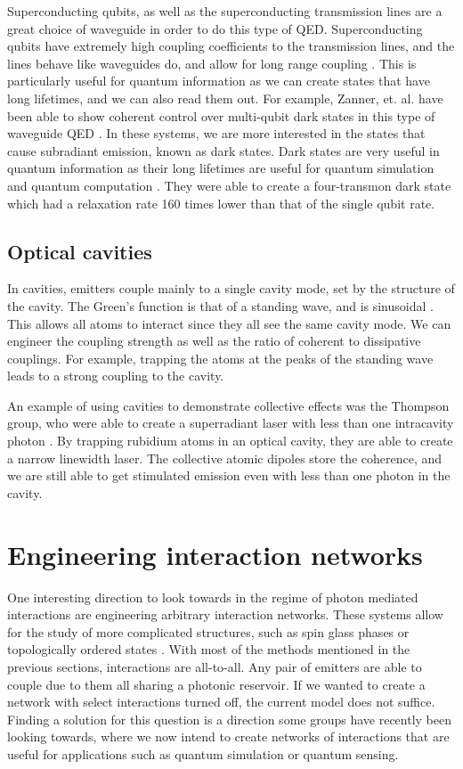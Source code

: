 \documentclass{article}
\begin{document}
Superconducting qubits, as well as the superconducting transmission lines are a great
choice of waveguide in order to do this type of QED. Superconducting qubits have
extremely high coupling coefficients to the transmission lines, and the lines behave
like waveguides do, and allow for long range coupling \cite{mirhosseini_cavity_2019,astafiev_resonance_2010}. This is particularly useful for
quantum information as we can create states that have long lifetimes, and we can also
read them out. For example, Zanner, et. al. have been able to show coherent control
over multi-qubit dark states in this type of waveguide QED \cite{zanner_coherent_2022}. In these systems, we are
more interested in the states that cause subradiant emission, known as dark states.
Dark states are very useful in quantum information as their long lifetimes are useful for
quantum simulation and quantum computation \cite{lidar_decoherence-free_1998,paulisch_universal_2016}. They were able to create a four-transmon dark state which had a relaxation
rate 160 times lower than that of the single qubit rate.
\subsection{Optical cavities}
In cavities, emitters couple mainly to a single cavity mode, set by the structure of
the cavity. The Green's function is that of a standing wave, and is
sinusoidal \cite{lodahl_interfacing_2015}. This allows all atoms to interact since they all see the same cavity mode.
We can engineer the coupling strength as well as the ratio of coherent to dissipative
couplings. For example, trapping the atoms at the peaks of the standing wave leads to
a strong coupling to the cavity.

An example of using cavities to demonstrate collective effects was the
Thompson group, who were able to create a superradiant laser with less than one intracavity
photon \cite{bohnet_steady-state_2012}. By trapping rubidium atoms in an optical cavity, they are able to create a
narrow linewidth laser. The collective atomic dipoles store the coherence, and we are
still able to get stimulated emission even with less than one photon in the cavity.

\section{Engineering interaction networks}
One interesting direction to look towards in the regime of photon mediated
interactions are engineering arbitrary interaction networks. These systems allow for
the study of more complicated structures, such as spin glass phases \cite{gopalakrishnan_frustration_2011,strack_dicke_2011} or
topologically ordered states \cite{hung_quantum_2016}. With most of the
methods mentioned in the previous sections, interactions are all-to-all. Any pair of
emitters are able to couple due to them all sharing a photonic reservoir. If we wanted
to create a network with select interactions turned off, the current model does not
suffice. Finding a solution for this question is a direction some
groups have recently been looking towards, where we now intend to create networks of
interactions that are useful for applications such as quantum simulation or quantum
sensing.
\end{document}
